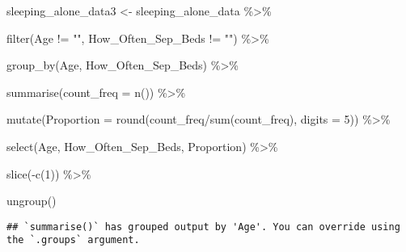 \documentclass[
]{article}
\newenvironment{Shaded}{\begin{snugshade}}{\end{snugshade}}
\newcommand{\AttributeTok}[1]{\textcolor[rgb]{0.77,0.63,0.00}{#1}}
\newcommand{\DecValTok}[1]{\textcolor[rgb]{0.00,0.00,0.81}{#1}}
\newcommand{\FunctionTok}[1]{\textcolor[rgb]{0.00,0.00,0.00}{#1}}
\newcommand{\NormalTok}[1]{#1}
\newcommand{\OtherTok}[1]{\textcolor[rgb]{0.56,0.35,0.01}{#1}}
\newcommand{\SpecialCharTok}[1]{\textcolor[rgb]{0.00,0.00,0.00}{#1}}
\newcommand{\StringTok}[1]{\textcolor[rgb]{0.31,0.60,0.02}{#1}}
\begin{document}
\begin{Shaded}
\begin{Highlighting}[]
\NormalTok{sleeping\_alone\_data3 }\OtherTok{\textless{}{-}}\NormalTok{ sleeping\_alone\_data }\SpecialCharTok{\%\textgreater{}\%}
  
  \FunctionTok{filter}\NormalTok{(Age }\SpecialCharTok{!=} \StringTok{""}\NormalTok{, How\_Often\_Sep\_Beds }\SpecialCharTok{!=} \StringTok{""}\NormalTok{) }\SpecialCharTok{\%\textgreater{}\%}
  
  \FunctionTok{group\_by}\NormalTok{(Age, How\_Often\_Sep\_Beds) }\SpecialCharTok{\%\textgreater{}\%}
  
  \FunctionTok{summarise}\NormalTok{(}\AttributeTok{count\_freq =} \FunctionTok{n}\NormalTok{()) }\SpecialCharTok{\%\textgreater{}\%}
  
  \FunctionTok{mutate}\NormalTok{(}\AttributeTok{Proportion =} \FunctionTok{round}\NormalTok{(count\_freq}\SpecialCharTok{/}\FunctionTok{sum}\NormalTok{(count\_freq), }\AttributeTok{digits =} \DecValTok{5}\NormalTok{)) }\SpecialCharTok{\%\textgreater{}\%}
  
  \FunctionTok{select}\NormalTok{(Age, How\_Often\_Sep\_Beds, Proportion) }\SpecialCharTok{\%\textgreater{}\%} 
  
  \FunctionTok{slice}\NormalTok{(}\SpecialCharTok{{-}}\FunctionTok{c}\NormalTok{(}\DecValTok{1}\NormalTok{)) }\SpecialCharTok{\%\textgreater{}\%}
  
  \FunctionTok{ungroup}\NormalTok{()}
\end{Highlighting}
\end{Shaded}

\begin{verbatim}
## `summarise()` has grouped output by 'Age'. You can override using the `.groups` argument.
\end{verbatim}
\end{document}
